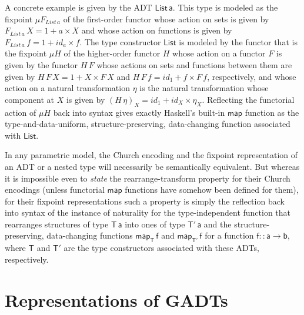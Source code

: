 \documentclass[submission,copyright,creativecommons]{eptcs}
\renewcommand{\id}{\mathit{id}}
\begin{document}
A concrete example is given by the ADT $\mathsf{List\,a}$. This type
is modeled as the fixpoint $\mu F_{\mathit{List\,a}}$ of the
first-order functor whose action on sets is given by
$F_{\mathit{List}\,a}\,X = 1 + a \times X$ and whose action on
functions is given by $F_{\mathit{List}\,a}\,f = 1 + \id_a \times
f$. The type constructor $\mathsf{List}$ is modeled by the functor
that is the fixpoint $\mu H$ of the higher-order functor $H$ whose
action on a functor $F$ is given by the functor $H\,F$ whose actions
on sets and functions between them are given by $H\,F\,X = 1 + X
\times F\,X$ and $H\,F\,f = \id_1 + f \times F\,f$, respectively, and
whose action on a natural transformation $\eta$ is the natural
transformation whose component at $X$ is given by $(H\,\eta)_X = \id_1
+ \id_X \times \eta_X$. Reflecting the functorial action of $\mu H$
back into syntax gives exactly Haskell's built-in $\mathsf{map}$
function as the type-and-data-uniform, structure-preserving,
data-changing function associated with $\mathsf{List}$.

\vspace*{0.05in}

In any parametric model, the Church encoding and the fixpoint
representation of an ADT or a nested type will necessarily be
semantically equivalent. But whereas it is impossible even to {\em
  state} the rearrange-transform property for their Church encodings
(unless functorial $\mathsf{map}$ functions have somehow been defined
for them), for their fixpoint representations such a property is
simply the reflection back into syntax of the instance of naturality
for the type-independent function that rearranges structures of type
$\mathsf{T\,a}$ into ones of type $\mathsf{T'\,a}$ and the
structure-preserving, data-changing functions $\mathsf{map_T\,f}$ and
$\mathsf{map_{T'}\,f}$ for a function $\mathsf{f :: a \to b}$, where
$\mathsf{T}$ and $\mathsf{T'}$ are the type constructors associated
with these ADTs, respectively.

\section{Representations of GADTs}\label{sec:gadts}
\end{document}
